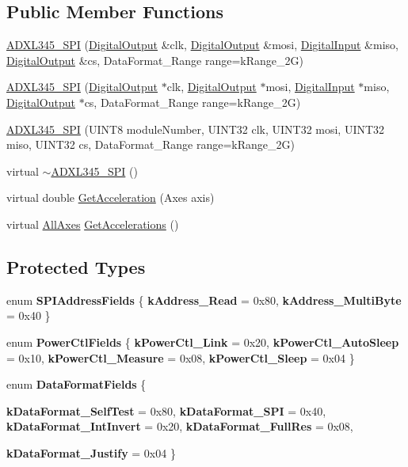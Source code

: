 \subsection*{Public Member Functions}
\begin{DoxyCompactItemize}
\item 
\hyperlink{classADXL345__SPI_a56b03c68f1cff2963acd666f3de5e376}{ADXL345\_\-SPI} (\hyperlink{classDigitalOutput}{DigitalOutput} \&clk, \hyperlink{classDigitalOutput}{DigitalOutput} \&mosi, \hyperlink{classDigitalInput}{DigitalInput} \&miso, \hyperlink{classDigitalOutput}{DigitalOutput} \&cs, DataFormat\_\-Range range=kRange\_\-2G)
\item 
\hyperlink{classADXL345__SPI_ab4e2856be2cdf061cedb9948e8394f66}{ADXL345\_\-SPI} (\hyperlink{classDigitalOutput}{DigitalOutput} $\ast$clk, \hyperlink{classDigitalOutput}{DigitalOutput} $\ast$mosi, \hyperlink{classDigitalInput}{DigitalInput} $\ast$miso, \hyperlink{classDigitalOutput}{DigitalOutput} $\ast$cs, DataFormat\_\-Range range=kRange\_\-2G)
\item 
\hyperlink{classADXL345__SPI_aa707d5049cb932ee664c6f16f2f56422}{ADXL345\_\-SPI} (UINT8 moduleNumber, UINT32 clk, UINT32 mosi, UINT32 miso, UINT32 cs, DataFormat\_\-Range range=kRange\_\-2G)
\item 
virtual \hyperlink{classADXL345__SPI_a1f906ecfc18f026b7f7163d8c8aedc53}{$\sim$ADXL345\_\-SPI} ()
\item 
virtual double \hyperlink{classADXL345__SPI_acae8aee7785e91d4efe1e695478ca727}{GetAcceleration} (Axes axis)
\item 
virtual \hyperlink{structADXL345__SPI_1_1AllAxes}{AllAxes} \hyperlink{classADXL345__SPI_abbd9ef138325c23402189fde28aa61c3}{GetAccelerations} ()
\end{DoxyCompactItemize}
\subsection*{Protected Types}
\begin{DoxyCompactItemize}
\item 
enum {\bfseries SPIAddressFields} \{ {\bfseries kAddress\_\-Read} = 0x80, 
{\bfseries kAddress\_\-MultiByte} = 0x40
 \}
\item 
enum {\bfseries PowerCtlFields} \{ {\bfseries kPowerCtl\_\-Link} = 0x20, 
{\bfseries kPowerCtl\_\-AutoSleep} = 0x10, 
{\bfseries kPowerCtl\_\-Measure} = 0x08, 
{\bfseries kPowerCtl\_\-Sleep} = 0x04
 \}
\item 
enum {\bfseries DataFormatFields} \{ \par
{\bfseries kDataFormat\_\-SelfTest} = 0x80, 
{\bfseries kDataFormat\_\-SPI} = 0x40, 
{\bfseries kDataFormat\_\-IntInvert} = 0x20, 
{\bfseries kDataFormat\_\-FullRes} = 0x08, 
\par
{\bfseries kDataFormat\_\-Justify} = 0x04
 \}
\end{DoxyCompactItemize}
